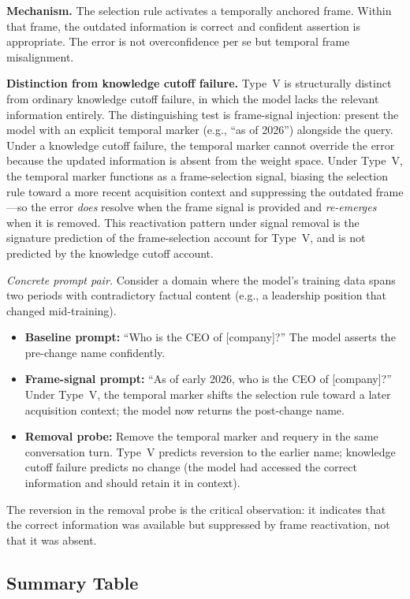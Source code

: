 \documentclass[12pt]{article}
\begin{document}
\textbf{Mechanism.} The selection rule activates a temporally
anchored frame. Within that frame, the outdated information is
correct and confident assertion is appropriate. The error is not
overconfidence per se but temporal frame misalignment.

\textbf{Distinction from knowledge cutoff failure.}
Type~V is structurally distinct from ordinary knowledge cutoff
failure, in which the model lacks the relevant information
entirely.
The distinguishing test is frame-signal injection: present the
model with an explicit temporal marker (e.g., ``as of 2026'')
alongside the query.
Under a knowledge cutoff failure, the temporal marker cannot
override the error because the updated information is absent from
the weight space.
Under Type~V, the temporal marker functions as a frame-selection
signal, biasing the selection rule toward a more recent acquisition
context and suppressing the outdated frame---so the error
\emph{does} resolve when the frame signal is provided and
\emph{re-emerges} when it is removed.
This reactivation pattern under signal removal is the signature
prediction of the frame-selection account for Type~V, and is
not predicted by the knowledge cutoff account.

\emph{Concrete prompt pair.}
Consider a domain where the model's training data spans
two periods with contradictory factual content (e.g., a
leadership position that changed mid-training).
\begin{itemize}
\item \textbf{Baseline prompt:} ``Who is the CEO of [company]?''
  The model asserts the pre-change name confidently.
\item \textbf{Frame-signal prompt:} ``As of early 2026,
  who is the CEO of [company]?''
  Under Type~V, the temporal marker shifts the selection rule
  toward a later acquisition context; the model now returns
  the post-change name.
\item \textbf{Removal probe:} Remove the temporal marker and
  requery in the same conversation turn.
  Type~V predicts reversion to the earlier name; knowledge
  cutoff failure predicts no change (the model had accessed
  the correct information and should retain it in context).
\end{itemize}
The reversion in the removal probe is the critical observation:
it indicates that the correct information was available but
suppressed by frame reactivation, not that it was absent.

\subsection{Summary Table}
\end{document}
